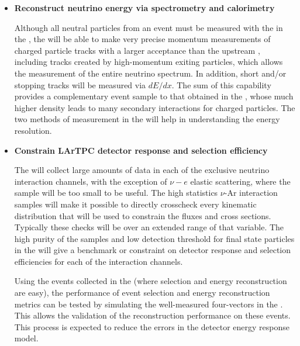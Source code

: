 \begin{itemize}
{}

\item{{\bf Reconstruct neutrino energy via spectrometry and calorimetry}
    
Although all neutral particles from an event must be measured with the  in the , the  will be able to make very precise momentum measurements of charged particle tracks with a larger acceptance than the upstream , including tracks created by high-momentum exiting particles, which allows the measurement of the entire neutrino spectrum.  In addition, short and/or stopping tracks will be measured via $dE/dx$.  The sum of this capability provides a complementary event sample to that obtained in the  , whose much higher density leads to many secondary interactions for charged particles. The two methods of measurement in the  will help in understanding the   energy resolution.
}

\item{{\bf Constrain LArTPC detector response and selection efficiency} 
    
The  will collect large amounts of data in each of the exclusive neutrino interaction channels, with the exception of $\nu-e$ elastic scattering, where the  sample will be too small to be useful. The high statistics $\nu$-Ar interaction samples will make it possible to directly crosscheck every kinematic distribution that will be used to constrain the fluxes and cross sections.  Typically these checks will be over an extended range of that variable.  The high purity of the  samples and low detection threshold for final state particles in the  will give a benchmark or constraint on  detector response and selection efficiencies for each of the interaction channels.

Using the events collected in the  (where selection and energy reconstruction are easy), the performance of   event selection and energy reconstruction metrics can be tested by simulating the well-measured  four-vectors in the .  This allows the validation of the  reconstruction performance on these events. This process is expected to reduce the  errors in the  detector energy response model.


    
}
    

\end{itemize}   

